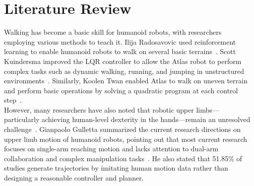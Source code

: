 \documentclass[11pt,a4paper]{article}
\begin{document}
\section{Literature Review}
Walking has become a basic skill for humanoid robots, with researchers employing various methods to teach it. Ilija Radosavovic used reinforcement learning to enable humanoid robots to walk on several basic terrains~\cite{RL_Walking}. Scott Kuindersma improved the LQR controller to allow the Atlas robot to perform complex tasks such as dynamic walking, running, and jumping in unstructured environments~\cite{kuindersma2016optimization}. Similarly, Koolen Twan enabled Atlas to walk on uneven terrain and perform basic operations by solving a quadratic program at each control step~\cite{Atlas2}.\\
However, many researchers have also noted that robotic upper limbs—particularly achieving human-level dexterity in the hands—remain an unresolved challenge~\cite{10415857}. Gianpaolo Gulletta summarized the current research directions on upper limb motion of humanoid robots, pointing out that most current research focuses on single-arm reaching motion and lacks attention to dual-arm collaboration and complex manipulation tasks~\cite{robotics9040102}. He also stated that 51.85\% of studies generate trajectories by imitating human motion data rather than designing a reasonable controller and planner.\\
\end{document}
